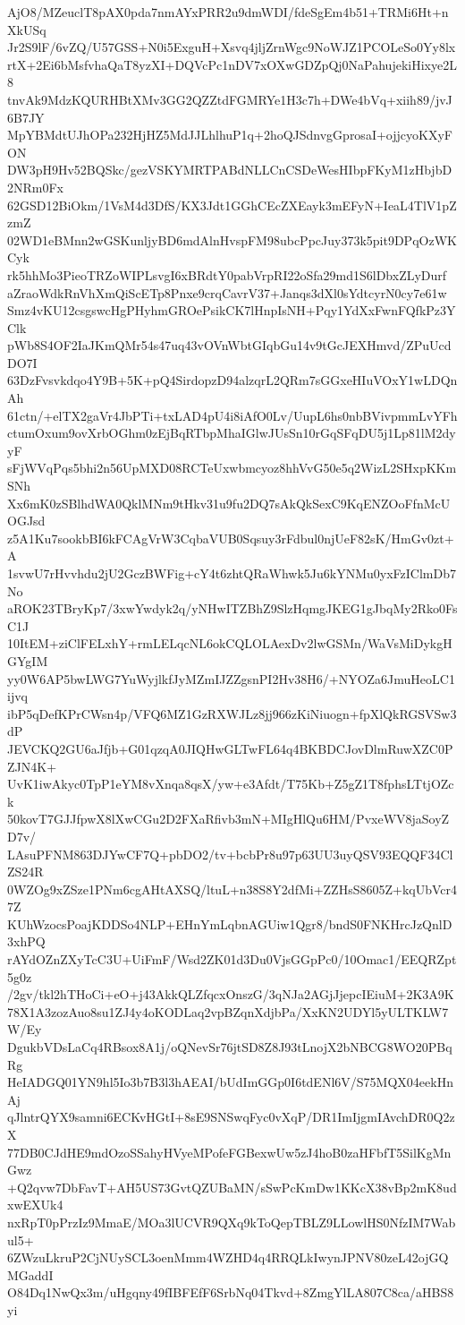 AjO8/MZeuclT8pAX0pda7nmAYxPRR2u9dmWDI/fdeSgEm4b51+TRMi6Ht+nXkUSq
Jr2S9lF/6vZQ/U57GSS+N0i5ExguH+Xsvq4jljZrnWgc9NoWJZ1PCOLeSo0Yy8lx
rtX+2Ei6bMsfvhaQaT8yzXI+DQVcPc1nDV7xOXwGDZpQj0NaPahujekiHixye2L8
tnvAk9MdzKQURHBtXMv3GG2QZZtdFGMRYe1H3c7h+DWe4bVq+xiih89/jvJ6B7JY
MpYBMdtUJhOPa232HjHZ5MdJJLhlhuP1q+2hoQJSdnvgGprosaI+ojjcyoKXyFON
DW3pH9Hv52BQSkc/gezVSKYMRTPABdNLLCnCSDeWesHIbpFKyM1zHbjbD2NRm0Fx
62GSD12BiOkm/1VsM4d3DfS/KX3Jdt1GGhCEcZXEayk3mEFyN+IeaL4TlV1pZzmZ
02WD1eBMnn2wGSKunljyBD6mdAlnHvspFM98ubcPpcJuy373k5pit9DPqOzWKCyk
rk5hhMo3PieoTRZoWIPLsvgI6xBRdtY0pabVrpRI22oSfa29md1S6lDbxZLyDurf
aZraoWdkRnVhXmQiScETp8Pnxe9crqCavrV37+Janqs3dXl0sYdtcyrN0cy7e61w
Smz4vKU12csgswcHgPHyhmGROePsikCK7lHnpIsNH+Pqy1YdXxFwnFQfkPz3YClk
pWb8S4OF2IaJKmQMr54s47uq43vOVnWbtGIqbGu14v9tGcJEXHmvd/ZPuUcdDO7I
63DzFvsvkdqo4Y9B+5K+pQ4SirdopzD94alzqrL2QRm7sGGxeHIuVOxY1wLDQnAh
61ctn/+elTX2gaVr4JbPTi+txLAD4pU4i8iAfO0Lv/UupL6hs0nbBVivpmmLvYFh
ctumOxum9ovXrbOGhm0zEjBqRTbpMhaIGlwJUsSn10rGqSFqDU5j1Lp81lM2dyyF
sFjWVqPqs5bhi2n56UpMXD08RCTeUxwbmcyoz8hhVvG50e5q2WizL2SHxpKKmSNh
Xx6mK0zSBlhdWA0QklMNm9tHkv31u9fu2DQ7sAkQkSexC9KqENZOoFfnMcUOGJsd
z5A1Ku7sookbBI6kFCAgVrW3CqbaVUB0Sqsuy3rFdbul0njUeF82sK/HmGv0zt+A
1svwU7rHvvhdu2jU2GczBWFig+cY4t6zhtQRaWhwk5Ju6kYNMu0yxFzIClmDb7No
aROK23TBryKp7/3xwYwdyk2q/yNHwITZBhZ9SlzHqmgJKEG1gJbqMy2Rko0FsC1J
10ItEM+ziClFELxhY+rmLELqcNL6okCQLOLAexDv2lwGSMn/WaVsMiDykgHGYgIM
yy0W6AP5bwLWG7YuWyjlkfJyMZmIJZZgsnPI2Hv38H6/+NYOZa6JmuHeoLC1ijvq
ibP5qDefKPrCWsn4p/VFQ6MZ1GzRXWJLz8jj966zKiNiuogn+fpXlQkRGSVSw3dP
JEVCKQ2GU6aJfjb+G01qzqA0JIQHwGLTwFL64q4BKBDCJovDlmRuwXZC0PZJN4K+
UvK1iwAkyc0TpP1eYM8vXnqa8qsX/yw+e3Afdt/T75Kb+Z5gZ1T8fphsLTtjOZck
50kovT7GJJfpwX8lXwCGu2D2FXaRfivb3mN+MIgHlQu6HM/PvxeWV8jaSoyZD7v/
LAsuPFNM863DJYwCF7Q+pbDO2/tv+bcbPr8u97p63UU3uyQSV93EQQF34ClZS24R
0WZOg9xZSze1PNm6cgAHtAXSQ/ltuL+n38S8Y2dfMi+ZZHsS8605Z+kqUbVcr47Z
KUhWzocsPoajKDDSo4NLP+EHnYmLqbnAGUiw1Qgr8/bndS0FNKHrcJzQnlD3xhPQ
rAYdOZnZXyTcC3U+UiFmF/Wsd2ZK01d3Du0VjsGGpPc0/10Omac1/EEQRZpt5g0z
/2gv/tkl2hTHoCi+eO+j43AkkQLZfqcxOnszG/3qNJa2AGjJjepcIEiuM+2K3A9K
78X1A3zozAuo8su1ZJ4y4oKODLaq2vpBZqnXdjbPa/XxKN2UDYl5yULTKLW7W/Ey
DgukbVDsLaCq4RBsox8A1j/oQNevSr76jtSD8Z8J93tLnojX2bNBCG8WO20PBqRg
HeIADGQ01YN9hl5Io3b7B3l3hAEAI/bUdImGGp0I6tdENl6V/S75MQX04eekHnAj
qJlntrQYX9samni6ECKvHGtI+8sE9SNSwqFyc0vXqP/DR1ImIjgmIAvchDR0Q2zX
77DB0CJdHE9mdOzoSSahyHVyeMPofeFGBexwUw5zJ4hoB0zaHFbfT5SilKgMnGwz
+Q2qvw7DbFavT+AH5US73GvtQZUBaMN/sSwPcKmDw1KKcX38vBp2mK8udxwEXUk4
nxRpT0pPrzIz9MmaE/MOa3lUCVR9QXq9kToQepTBLZ9LLowlHS0NfzIM7Wabul5+
6ZWzuLkruP2CjNUySCL3oenMmm4WZHD4q4RRQLkIwynJPNV80zeL42ojGQMGaddI
O84Dq1NwQx3m/uHgqny49fIBFEfF6SrbNq04Tkvd+8ZmgYlLA807C8ca/aHBS8yi
